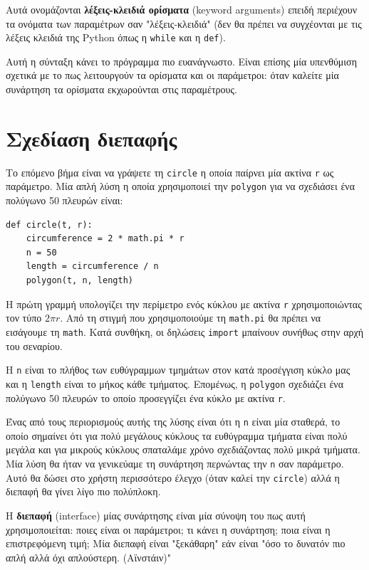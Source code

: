 \documentclass[10pt]{book}
\begin{document}
Αυτά ονομάζονται {\bf λέξεις-κλειδιά ορίσματα} (keyword arguments) επειδή περιέχουν τα ονόματα των παραμέτρων σαν "λέξεις-κλειδιά" (δεν θα πρέπει να συγχέονται με τις λέξεις κλειδιά της Python όπως η {\tt while} και η {\tt def}).

Αυτή η σύνταξη κάνει το πρόγραμμα πιο ευανάγνωστο. Είναι επίσης μία υπενθύμιση σχετικά με το πως λειτουργούν τα ορίσματα και οι παράμετροι: όταν καλείτε μία συνάρτηση τα ορίσματα εκχωρούνται στις παραμέτρους.


\section{Σχεδίαση διεπαφής}

Το επόμενο βήμα είναι να γράψετε τη {\tt circle} η οποία παίρνει μία ακτίνα {\tt r} ως παράμετρο. Μία απλή λύση η οποία χρησιμοποιεί την {\tt polygon} για να σχεδιάσει ένα πολύγωνο 50 πλευρών είναι:


\begin{verbatim}
def circle(t, r):
    circumference = 2 * math.pi * r
    n = 50
    length = circumference / n
    polygon(t, n, length)
\end{verbatim}
%

Η πρώτη γραμμή υπολογίζει την περίμετρο ενός κύκλου με ακτίνα {\tt r} 
χρησιμοποιώντας τον τύπο  $2 \pi r$. Από τη στιγμή που χρησιμοποιούμε τη 
{\tt math.pi} θα πρέπει να εισάγουμε τη {\tt math}. Κατά συνθήκη, οι δηλώσεις
{\tt import} μπαίνουν συνήθως στην αρχή του σεναρίου.

Η {\tt n} είναι το πλήθος των ευθύγραμμων τμημάτων στον κατά προσέγγιση κύκλο μας και η {\tt length} είναι το μήκος κάθε τμήματος. Επομένως, η {\tt polygon} 
σχεδιάζει ένα πολύγωνο 50 πλευρών το οποίο προσεγγίζει ένα κύκλο με ακτίνα  {\tt r}. 

Ένας από τους περιορισμούς αυτής της λύσης είναι ότι η  {\tt n}  είναι μία σταθερά, το οποίο σημαίνει ότι για πολύ μεγάλους κύκλους τα ευθύγραμμα τμήματα είναι πολύ μεγάλα και για μικρούς κύκλους σπαταλάμε χρόνο σχεδιάζοντας πολύ μικρά τμήματα. Μία λύση θα ήταν να γενικεύαμε τη συνάρτηση περνώντας την {\tt n} σαν παράμετρο. Αυτό θα δώσει στο χρήστη περισσότερο έλεγχο (όταν καλεί την {\tt circle}) αλλά η διεπαφή θα γίνει λίγο πιο πολύπλοκη.

Η {\bf διεπαφή} (interface) μίας συνάρτησης είναι μία σύνοψη του πως αυτή χρησιμοποιείται: ποιες είναι οι παράμετροι; τι κάνει η συνάρτηση; ποια είναι η επιστρεφόμενη τιμή; Μία διεπαφή είναι "ξεκάθαρη" εάν είναι "όσο το δυνατόν πιο απλή αλλά όχι απλούστερη. (Αϊνστάιν)"
\end{document}
